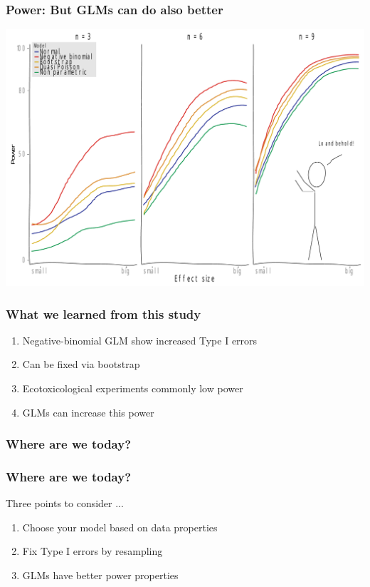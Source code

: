 \documentclass[
	10pt
	]{beamer}
\begin{document}
\begin{frame}
\frametitle{Power: But GLMs can do also better}
	\begin{center}
		\includegraphics[width = \textwidth]{figs/p_pow_xkcd.pdf}
	\end{center}
\end{frame}



\begin{frame}
\frametitle{What we learned from this study}
		\begin{enumerate}
			\item Negative-binomial GLM show increased \alert{Type I errors}
			\item Can be fixed via \alert{bootstrap}
			\item Ecotoxicological experiments commonly \alert{low power} 
			\item \alert{GLMs} can increase this  power
		\end{enumerate}
\end{frame}


\begin{frame}
\frametitle{Where are we today?}
	
\end{frame}


{%
\begin{frame}
\frametitle{Where are we today?}
	\begin{exampleblock}{Three points to consider ...}
		\begin{enumerate}
			\item Choose your model based on data properties
			\item Fix Type I errors by resampling
			\item GLMs have better power properties
		\end{enumerate}
	\end{exampleblock}
\end{frame}
}
\end{document}
